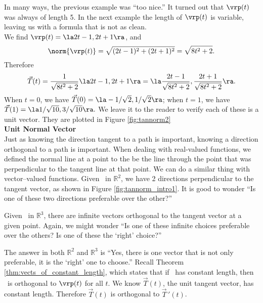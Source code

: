 In many ways, the previous example was ``too nice.'' It turned out that $\vrp(t)$ was always of length 5. In the next example the length of $\vrp(t)$ is variable, leaving us with a formula that is not as clean.\\

{We find $\vrp(t) = \la 2t-1,2t+1\ra$, and $$\norm{\vrp(t)} = \sqrt{(2t-1)^2+(2t+1)^2} = \sqrt{8t^2+2}.$$
Therefore $$\vec T(t) = \frac{1}{\sqrt{8t^2+2}}\la 2t-1,2t+1\ra = \la \frac{2t-1}{\sqrt{8t^2+2}},\frac{2t+1}{\sqrt{8t^2+2}}\ra.$$
When $t=0$, we have $\vec T(0) = \la -1/\sqrt{2},1/\sqrt{2}\ra$; when $t=1$, we have $\vec T(1) = \la 1/\sqrt{10}, 3/\sqrt{10}\ra.$ We leave it to the reader to verify each of these is a unit vector. They are plotted in Figure \ref{fig:tannorm2}
}\\

\noindent\textbf{\large Unit Normal Vector}\\

Just as knowing the direction tangent to a path is important, knowing a direction orthogonal to a path is important. When dealing with real-valued functions, we defined the normal line at a point to the be the line through the point that was perpendicular to the tangent line at that point. We can do a similar thing with vector--valued functions. Given \vrt\ in $\mathbb{R}^2$, we have 2 directions perpendicular to the tangent vector, as shown in Figure \ref{fig:tannorm_intro1}. It is good to wonder ``Is one of these two directions preferable over the other?''

Given \vrt\ in $\mathbb{R}^3$,  there are infinite vectors orthogonal to the tangent vector at a given point. Again, we might wonder ``Is one of these infinite choices preferable over the others? Is one of these the `right' choice?''

The answer in both $\mathbb{R}^2$ and $\mathbb{R}^3$ is ``Yes, there is one vector that is not only preferable, it is the `right' one to choose.'' Recall Theorem \ref{thm:vects_of_constant_length}, which states that if \vrt\ has constant length, then \vrt\ is orthogonal to $\vrp(t)$ for all $t$. We know $\vec T(t)$, the unit tangent vector, has constant length. Therefore $\vec T(t)$ is orthogonal to $\vec T\,'(t)$.

